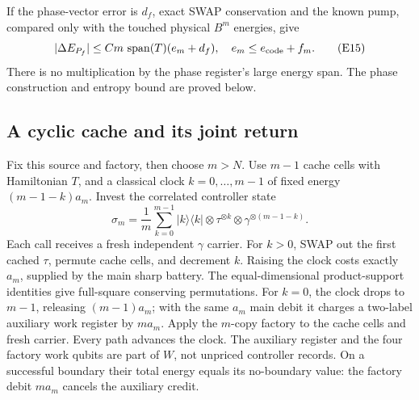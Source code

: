 \documentclass[11pt]{article}
\theoremstyle{definition}
\theoremstyle{remark}
\begin{document}
If the phase-vector error is \(d_f\), exact SWAP conservation and
the known pump, compared only with the touched physical \(B^m\)
energies, give
\[
 |\Delta E_{P_f}|\le
 C m\,\operatorname{span}(T)(e_m+d_f),\quad
 e_m\le e_{\rm code}+f_m.                           \tag{E15}
\]
There is no multiplication by the phase register's large energy span.
The phase construction and entropy bound are proved below.

\subsection{A cyclic cache and its joint return}
Fix this source and factory, then choose \(m>N\).
Use \(m-1\) cache cells with Hamiltonian \(T\), and a classical clock
\(k=0,\ldots,m-1\) of fixed energy \((m-1-k)a_m\).
Invest the correlated controller state
\[
 \sigma_m=\frac1m\sum_{k=0}^{m-1}|k\rangle\langle k|
            \otimes\tau^{\otimes k}\otimes\gamma^{\otimes(m-1-k)}.
                                                               \tag{E16}
\]
Each call receives a fresh independent \(\gamma\) carrier.
For \(k>0\), SWAP out the first cached \(\tau\), permute cache cells,
and decrement \(k\). Raising the clock costs exactly \(a_m\), supplied
by the main sharp battery. The equal-dimensional product-support
identities give full-square conserving permutations.
For \(k=0\), the clock drops to \(m-1\), releasing \((m-1)a_m\);
with the same \(a_m\) main debit it charges a two-label auxiliary
work register by \(ma_m\). Apply the \(m\)-copy factory to the
cache cells and fresh carrier. Every path advances the clock.
The auxiliary register and the four factory work qubits are part of
\(W\), not unpriced controller records. On a successful boundary
their total energy equals its no-boundary value: the factory debit
\(ma_m\) cancels the auxiliary credit.
\end{document}
